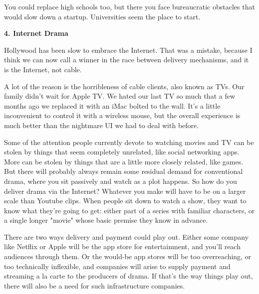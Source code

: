 You could replace high
                  schools too, but there you face bureaucratic obstacles that
                  would slow down a startup. Universities seem the place to
                  start.

\textbf{4. Internet Drama}

Hollywood has been slow to embrace the Internet.
                  That was a mistake, because I think we can now call a winner
                  in the race between delivery mechanisms, and it is the
                  Internet, not cable.

A lot of the reason is the
                  horribleness of cable clients, also known as TVs. Our family
                  didn't wait for Apple TV. We hated our last TV so much that a
                  few months ago we replaced it with an iMac bolted to the wall.
                  It's a little inconvenient to control it with a wireless
                  mouse, but the overall experience is much better than the
                  nightmare UI we had to deal with before.

Some of
                  the attention people currently devote to watching movies and
                  TV can be stolen by things that seem completely unrelated,
                  like social networking apps. More can be stolen by things that
                  are a little more closely related, like games. But there will
                  probably always remain some residual demand for conventional
                  drama, where you sit passively and watch as a plot happens. So
                  how do you deliver drama via the Internet? Whatever you make
                  will have to be on a larger scale than Youtube clips. When
                  people sit down to watch a show, they want to know what
                  they're going to get: either part of a series with familiar
                  characters, or a single longer "movie" whose basic premise
                  they know in advance.

There are two ways delivery
                  and payment could play out. Either some company like Netflix
                  or Apple will be the app store for entertainment, and you'll
                  reach audiences through them. Or the would-be app stores will
                  be too overreaching, or too technically inflexible, and
                  companies will arise to supply payment and streaming a la
                  carte to the producers of drama. If that's the way things play
                  out, there will also be a need for such infrastructure
                  companies.


